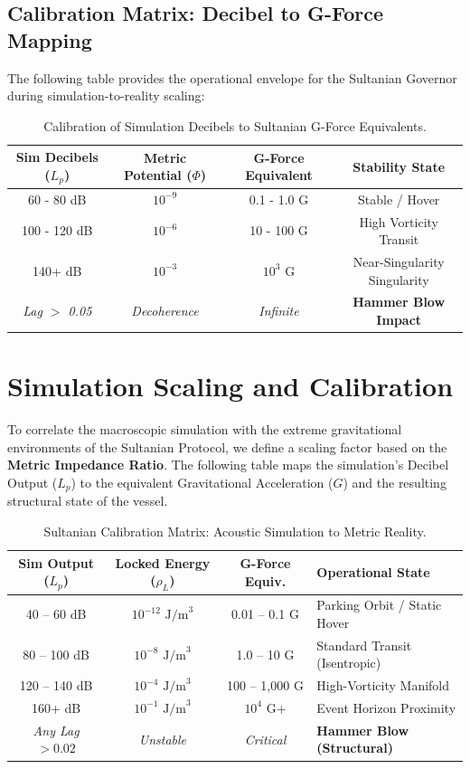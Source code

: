 \documentclass[11pt,a4paper]{article}
\begin{document}
\subsection{Calibration Matrix: Decibel to G-Force Mapping}
The following table provides the operational envelope for the Sultanian Governor during simulation-to-reality scaling:

\begin{table}[htbp]
\centering
\begin{tabular}{|c|c|c|c|}
\hline
\textbf{Sim Decibels ($L_p$)} & \textbf{Metric Potential ($\Phi$)} & \textbf{G-Force Equivalent} & \textbf{Stability State} \\ \hline
60 - 80 dB & $10^{-9}$ & 0.1 - 1.0 G & Stable / Hover \\ \hline
100 - 120 dB & $10^{-6}$ & 10 - 100 G & High Vorticity Transit \\ \hline
140+ dB & $10^{-3}$ & $10^3$ G & Near-Singularity Singularity \\ \hline
\textit{Lag $>$ 0.05} & \textit{Decoherence} & \textit{Infinite} & \textbf{Hammer Blow Impact} \\ \hline
\end{tabular}
\caption{Calibration of Simulation Decibels to Sultanian G-Force Equivalents.}
\label{table:calibration}
\end{table}

\section{Simulation Scaling and Calibration}

To correlate the macroscopic simulation with the extreme gravitational environments of the Sultanian Protocol, we define a scaling factor based on the \textbf{Metric Impedance Ratio}. The following table maps the simulation's Decibel Output ($L_p$) to the equivalent Gravitational Acceleration ($G$) and the resulting structural state of the vessel.

\begin{table}[htbp]
\centering
\begin{tabular}{|c|c|c|l|}
\hline
\textbf{Sim Output ($L_p$)} & \textbf{Locked Energy ($\rho_L$)} & \textbf{G-Force Equiv.} & \textbf{Operational State} \\ \hline
40 -- 60 dB & $10^{-12} \text{ J/m}^3$ & 0.01 -- 0.1 G & Parking Orbit / Static Hover \\ \hline
80 -- 100 dB & $10^{-8} \text{ J/m}^3$ & 1.0 -- 10 G & Standard Transit (Isentropic) \\ \hline
120 -- 140 dB & $10^{-4} \text{ J/m}^3$ & 100 -- 1,000 G & High-Vorticity Manifold \\ \hline
160+ dB & $10^{-1} \text{ J/m}^3$ & $10^4$ G+ & Event Horizon Proximity \\ \hline
\textit{Any Lag $> 0.02$} & \textit{Unstable} & \textit{Critical} & \textbf{Hammer Blow (Structural)} \\ \hline
\end{tabular}
\caption{Sultanian Calibration Matrix: Acoustic Simulation to Metric Reality.}
\label{table:gforce_calibration}
\end{table}
\end{document}
